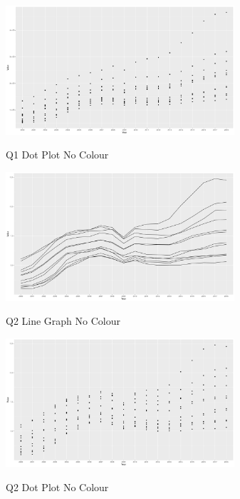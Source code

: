 \documentclass{article}
\begin{document}
\begin{figure}[H]
  \begin{minipage}[b]{1.0\linewidth}
    \centering
    \centerline{\includegraphics[width=8.5cm]{Q1Geom_point_no_colour}}
    \centerline{Q1 Dot Plot No Colour}\medskip
  \end{minipage}
\end{figure}

\begin{figure}[H]
  \begin{minipage}[b]{1.0\linewidth}
    \centering
    \centerline{\includegraphics[width=8.5cm]{Q2Geom_line_no_colour}}
    \centerline{Q2 Line Graph No Colour}\medskip
  \end{minipage}
\end{figure}

\begin{figure}[H]
  \begin{minipage}[b]{1.0\linewidth}
    \centering
    \centerline{\includegraphics[width=8.5cm]{Q2Geom_point_no_colour}}
    \centerline{Q2 Dot Plot No Colour}\medskip
  \end{minipage}
\end{figure}
\end{document}
